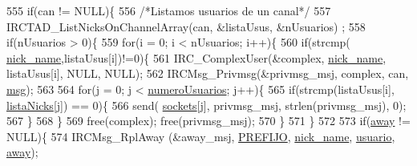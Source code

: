 \begin{DoxyCode}
{{{{{{{{{{555                                         \textcolor{keywordflow}{if}(can != NULL)\{
556                                                 \textcolor{comment}{/*Listamos usuarios de un canal*/}
557                                                 IRCTAD\_ListNicksOnChannelArray(can, &listaUsus, &nUsuarios)
      ;        
558                                                 \textcolor{keywordflow}{if}(nUsuarios > 0)\{
559                                                         \textcolor{keywordflow}{for}(i = 0; i < nUsuarios; i++)\{
560                                                                 \textcolor{keywordflow}{if}(strcmp(
      \hyperlink{_g-2361-06-_p1-_server_8c_aabbf66718cda228b924a4a9441eadf62}{nick\_name},listaUsus[i])!=0)\{
561                                                                         IRC\_ComplexUser(&complex, 
      \hyperlink{_g-2361-06-_p1-_server_8c_aabbf66718cda228b924a4a9441eadf62}{nick\_name}, listaUsus[i], NULL, NULL);
562                                                                         IRCMsg\_Privmsg(&privmsg\_msj, 
      complex, can, \hyperlink{_g-2361-06-_p1-_server_8c_a32d2f5216cddb59c7cc8fb2806a7e727}{msg});
563 
564                                                                         \textcolor{keywordflow}{for}(j = 0; j < 
      \hyperlink{_g-2361-06-_p1-_server_8c_ac9a5ec6f534d2a8e2a870179807d32dc}{numeroUsuarios}; j++)\{
565                                                                                 \textcolor{keywordflow}{if}(strcmp(listaUsus[i], 
      \hyperlink{_g-2361-06-_p1-_server_8c_a713172366a6be2fbf8456a4b43702603}{listaNicks}[j]) == 0)\{
566                                                                                         send(
      \hyperlink{_g-2361-06-_p1-_server_8c_a7724e53f22e431d1ecb6516951a172e1}{sockets}[j], privmsg\_msj, strlen(privmsg\_msj), 0);
567                                                                                 \}
568                                                                         \}
569                                                                         free(complex); free(privmsg\_msj);
570                                                                 \}
571                                                         \}
572 
573                                                         \textcolor{keywordflow}{if}(\hyperlink{_g-2361-06-_p1-_server_8c_adf86742e21384f58f8999d8317e6a370}{away} != NULL)\{
574                                                                 IRCMsg\_RplAway (&away\_msj, 
      \hyperlink{_g-2361-06-_p1-_server_8h_a78c658ff923693099f7b621e7c351129}{PREFIJO}, \hyperlink{_g-2361-06-_p1-_server_8c_aabbf66718cda228b924a4a9441eadf62}{nick\_name}, \hyperlink{_g-2361-06-_p1-_server_8c_a0147a5b81499984f9cb00379a8cb84af}{usuario}, \hyperlink{_g-2361-06-_p1-_server_8c_adf86742e21384f58f8999d8317e6a370}{away});
}}}}}}}}}}
\end{DoxyCode}
